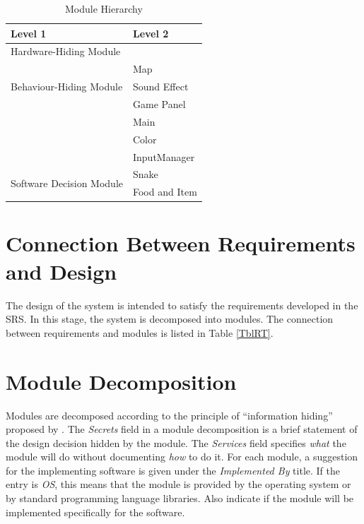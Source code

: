 \documentclass[12pt, titlepage]{article}
\begin{document}
\begin{table}[h!]
\centering
\begin{tabular}{p{} p{}}
\toprule
\textbf{Level 1} & \textbf{Level 2}\\
\midrule

{Hardware-Hiding Module} &  \\
\midrule

\multirow{3}{0.3\textwidth}{Behaviour-Hiding Module} & Map\\
~ & Sound Effect\\
~ & Game Panel\\
~ & Main\\
~ & Color\\
~ & InputManager\\
\midrule

\multirow{2}{0.3\textwidth}{Software Decision Module} & Snake\\
~ & Food and Item\\
\bottomrule

\end{tabular}
\caption{Module Hierarchy}
\label{TblMH}
\end{table}

\section{Connection Between Requirements and Design} \label{SecConnection}

The design of the system is intended to satisfy the requirements developed in
the SRS. In this stage, the system is decomposed into modules. The connection
between requirements and modules is listed in Table \ref{TblRT}.

\section{Module Decomposition} \label{SecMD}

Modules are decomposed according to the principle of ``information hiding''
proposed by \citet{ParnasEtAl1984}. The \emph{Secrets} field in a module
decomposition is a brief statement of the design decision hidden by the
module. The \emph{Services} field specifies \emph{what} the module will do
without documenting \emph{how} to do it. For each module, a suggestion for the
implementing software is given under the \emph{Implemented By} title. If the
entry is \emph{OS}, this means that the module is provided by the operating
system or by standard programming language libraries.  Also indicate if the
module will be implemented specifically for the software.
\end{document}
